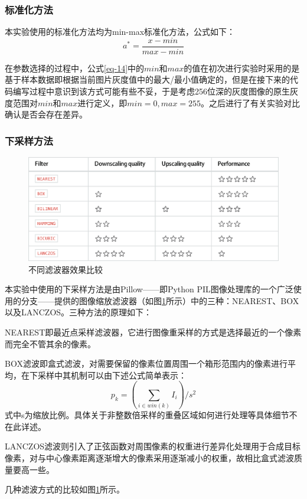 \documentclass[UTF8]{ctexart}
\begin{document}
\subsubsection{标准化方法}
本实验使用的标准化方法均为min-max标准化方法，公式如下：
\begin{equation}\label{eq-14}
    a^*=\frac{x-min}{max-min}
\end{equation}
\par
在参数选择的过程中，公式\eqref{eq-14}中的\(min\)和\(max\)的值在初次进行实验时采用的是基于样本数据即根据当前图片灰度值中的最大/最小值确定的，但是在接下来的代码编写过程中意识到该方式可能有些不妥，于是考虑256位深的灰度图像的原生灰度范围对\(min\)和\(max\)进行定义，即\(min=0,max=255\)。之后进行了有关实验对比确认是否会存在差异。
\subsubsection{下采样方法}
\begin{figure}[htbp]
    \centering
    \includegraphics[scale = 0.7]{Filter.eps}
    \caption{不同滤波器效果比较}\label{fig-filter_comparison}
\end{figure}
本实验中使用的下采样方法是由Pillow——即Python PIL图像处理库的一个广泛使用的分支——提供的图像缩放滤波器（如图\ref{fig-filter_comparison}所示）中的三种：NEAREST、BOX以及LANCZOS。三种方法的原理如下：\par
NEAREST即最近点采样滤波器，它进行图像重采样的方式是选择最近的一个像素而完全不管其余的像素。\par
BOX滤波即盒式滤波，对需要保留的像素位置周围一个箱形范围内的像素进行平均，在下采样中其机制可以由下述公式简单表示：
\begin{equation}\label{eq-15}
    p_k=\left({\sum_{i\in win(k)}{I_i}}\right)/s^2
\end{equation}
式中s为缩放比例。具体关于非整数倍采样的重叠区域如何进行处理等具体细节不在此详述。\par
LANCZOS滤波则引入了正弦函数对周围像素的权重进行差异化处理用于合成目标像素，对与中心像素距离逐渐增大的像素采用逐渐减小的权重，故相比盒式滤波质量要高一些。\par
几种滤波方式的比较如图\ref{fig-filter_comparison}所示。
\end{document}
